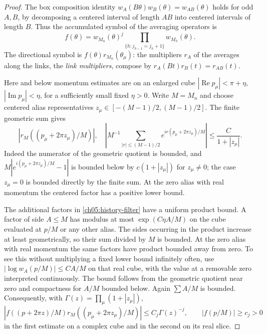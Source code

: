 \begin{proof}
The box composition identity
$w_A(B\theta)w_B(\theta)=w_{AB}(\theta)$ holds for odd
$A,B$, by decomposing a centered interval of length $AB$
into centered intervals of length $B$.
Thus the accumulated symbol of the averaging operators is
\begin{equation}
 f(\theta)=w_{M_n}(\theta)^j
       \prod_{\{h:j_{h-1}=j_h+1\}}w_{M_h}(\theta).
 \label{ch05:history-filter}
\end{equation}
The directional symbol is
$f(\theta)r_{M_n}(\theta_\mu)$: the multipliers $r_A$ of the averages along the links, the \emph{link multipliers}, compose by
$r_A(Bt)r_B(t)=r_{AB}(t)$.

Here and below momentum estimates are on an enlarged cube
$|\operatorname{Re}p_\mu|<\pi+\eta$,
$|\operatorname{Im}p_\mu|<\eta$, for a sufficiently small fixed
$\eta>0$. Write $M=M_n$ and choose centered alias representatives
$z_\mu\in[-(M-1)/2,(M-1)/2]$. The finite geometric sum gives
\[
 |r_M((p_\mu+2\pi z_\mu)/M)|,\quad
 \left|M^{-1}\sum_{|r|\le(M-1)/2}
     e^{ir(p_\mu+2\pi z_\mu)/M}\right|
       \le \frac{C}{1+|z_\mu|}.
\]
Indeed the numerator of the geometric quotient is bounded, and
$M|e^{i(p_\mu+2\pi z_\mu)/M}-1|$ is bounded below by
$c(1+|z_\mu|)$ for $z_\mu\ne0$; the case $z_\mu=0$ is bounded
directly by the finite sum. At the zero alias with real momentum the
centered factor has a positive lower bound.

The additional factors in \eqref{ch05:history-filter} have a
uniform product bound. A factor of side $A\le M$ has modulus
at most $\exp(C\eta A/M)$ on the cube evaluated at $p/M$
or any other alias. The sides occurring in the product increase
at least geometrically, so their sum divided by $M$ is bounded.
At the zero alias with real momentum the same factors have product bounded
away from zero. To see this without multiplying a fixed lower
bound infinitely often, use
$|\log w_A(p/M)|\le C A/M$ on that real cube, with the value
at a removable zero interpreted continuously. The bound follows
from the geometric quotient near zero and compactness for
$A/M$ bounded below. Again $\sum A/M$ is bounded.
Consequently, with
$\Gamma(z)=\prod_\mu(1+|z_\mu|)$,
\[
 |f((p+2\pi z)/M)r_M((p_\mu+2\pi z_\mu)/M)|
       \le C_j\Gamma(z)^{-j},
 \qquad |f(p/M)|\ge c_j>0
\]
in the first estimate on a complex cube and in the second on its
real slice.


\end{proof}
